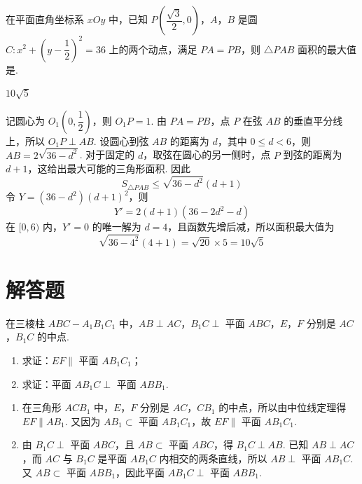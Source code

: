 \begin{problem}
在平面直角坐标系 \(xOy\) 中，已知 \(P\!\left(\dfrac{\sqrt3}{2},0\right)\)，\(A\)，\(B\) 是圆 \(C:x^2+\left(y-\dfrac12\right)^2=36\) 上的两个动点，满足 \(PA=PB\)，则 \(\triangle PAB\) 面积的最大值是\fillinblank{}.
\end{problem}

\begin{answer}
\(10\sqrt5\)
\end{answer}

\begin{solution}
记圆心为 \(O_1\left(0,\dfrac12\right)\)，则 \(O_1P=1\). 由 \(PA=PB\)，点 \(P\) 在弦 \(AB\) 的垂直平分线上，所以 \(O_1P\perp AB\). 设圆心到弦 \(AB\) 的距离为 \(d\)，其中 \(0\leq d<6\)，则 \(AB=2\sqrt{36-d^2}\). 对于固定的 \(d\)，取弦在圆心的另一侧时，点 \(P\) 到弦的距离为 \(d+1\)，这给出最大可能的三角形面积. 因此
\[
S_{\triangle PAB}\leq\sqrt{36-d^2}(d+1)
\]
令 \(Y=(36-d^2)(d+1)^2\)，则
\[
Y'=2(d+1)(36-2d^2-d)
\]
在 \([0,6)\) 内，\(Y'=0\) 的唯一解为 \(d=4\)，且函数先增后减，所以面积最大值为
\[
\sqrt{36-4^2}(4+1)=\sqrt{20}\times5=10\sqrt5
\]
\end{solution}

\section{解答题}

\begin{problem}
在三棱柱 \(ABC-A_1B_1C_1\) 中，\(AB\perp AC\)，\(B_1C\perp\) 平面 \(ABC\)，\(E\)，\(F\) 分别是 \(AC\)，\(B_1C\) 的中点.

\begin{enumerate}
\item 求证：\(EF\parallel\) 平面 \(AB_1C_1\)；
\item 求证：平面 \(AB_1C\perp\) 平面 \(ABB_1\).
\end{enumerate}

\end{problem}

\begin{solution}
\begin{enumerate}
\item 在三角形 \(ACB_1\) 中，\(E\)，\(F\) 分别是 \(AC\)，\(CB_1\) 的中点，所以由中位线定理得 \(EF\parallel AB_1\). 又因为 \(AB_1\subset\) 平面 \(AB_1C_1\)，故 \(EF\parallel\) 平面 \(AB_1C_1\).
\item 由 \(B_1C\perp\) 平面 \(ABC\)，且 \(AB\subset\) 平面 \(ABC\)，得 \(B_1C\perp AB\). 已知 \(AB\perp AC\)，而 \(AC\) 与 \(B_1C\) 是平面 \(AB_1C\) 内相交的两条直线，所以 \(AB\perp\) 平面 \(AB_1C\). 又 \(AB\subset\) 平面 \(ABB_1\)，因此平面 \(AB_1C\perp\) 平面 \(ABB_1\).
\end{enumerate}
\end{solution}

